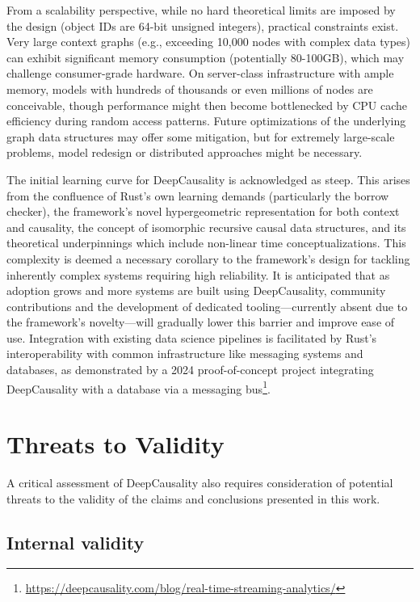 From a scalability perspective, while no hard theoretical limits are imposed by the design (object IDs are 64-bit unsigned integers), practical constraints exist. Very large context graphs (e.g., exceeding 10,000 nodes with complex data types) can exhibit significant memory consumption (potentially 80-100GB), which may challenge consumer-grade hardware. On server-class infrastructure with ample memory, models with hundreds of thousands or even millions of nodes are conceivable, though performance might then become bottlenecked by CPU cache efficiency during random access patterns. Future optimizations of the underlying graph data structures may offer some mitigation, but for extremely large-scale problems, model redesign or distributed approaches might be necessary.

The initial learning curve for DeepCausality is acknowledged as steep. This arises from the confluence of Rust's own learning demands (particularly the borrow checker), the framework's novel hypergeometric representation for both context and causality, the concept of isomorphic recursive causal data structures, and its theoretical underpinnings which include non-linear time conceptualizations. This complexity is deemed a necessary corollary to the framework's design for tackling inherently complex systems requiring high reliability. It is anticipated that as adoption grows and more systems are built using DeepCausality, community contributions and the development of dedicated tooling—currently absent due to the framework's novelty—will gradually lower this barrier and improve ease of use. Integration with existing data science pipelines is facilitated by Rust's interoperability with common infrastructure like messaging systems and databases, as demonstrated by a 2024 proof-of-concept project integrating DeepCausality with a database via a messaging bus\footnote{\url{https://deepcausality.com/blog/real-time-streaming-analytics/}}.


\section{Threats to Validity}
\label{sec:threats_to_validity}

A critical assessment of DeepCausality also requires consideration of potential threats to the validity of the claims and conclusions presented in this work.

\subsection{Internal validity}

